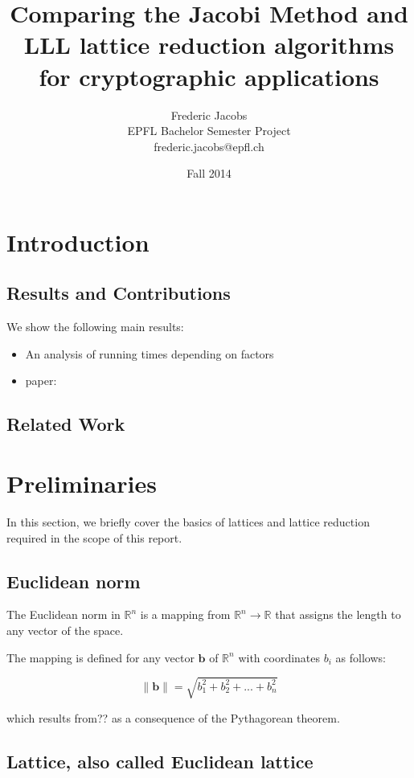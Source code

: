 \documentclass[10pt, a4paper]{article}
\title{Comparing the Jacobi Method and LLL lattice reduction algorithms for cryptographic applications}
\date{Fall 2014}
\author{Frederic Jacobs\\ EPFL Bachelor Semester Project\\ frederic.jacobs@epfl.ch}
\newcommand{\my}[1]{{\color{blue} #1 }}
\renewcommand{\vec}[1]{\mathbf{#1}}
\begin{document}
\maketitle

\section{Introduction}
\subsection{Results and Contributions}

\my{We show the following main results:
\begin{itemize}
\item An analysis of running times depending on factors
\item paper: \cite{originalJacobiMethodLatticeBasisReduction}
\end{itemize}
}
\subsection{Related Work}

\section{Preliminaries}

In this section, we briefly cover the basics of lattices and lattice reduction required in the scope of this report.

\subsection{Euclidean norm}

The Euclidean norm in $\mathbb{R}^n$ is a mapping from $\mathbb{R}^n \to \mathbb{R}$ that assigns the length to any vector of the space.

The mapping is defined for any vector $\vec{b}$ of $\mathbb{R}^n$ with coordinates $b_i$ as follows: 

\[
\|\mathbf{b}\| = \sqrt{b_1^2 + b_2^2 + ... + b_n^2} 
\] 

\my{ which results from??} as a consequence of the Pythagorean theorem.

\subsection{Lattice, also called Euclidean lattice}
\end{document}
